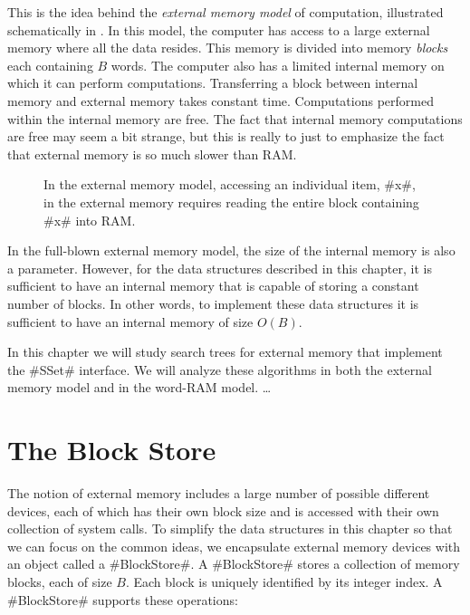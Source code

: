 
This is the idea behind the \emph{external memory model} of computation,
illustrated schematically in .  In this model, the computer
has access to a large external memory where all the data resides.
This memory is divided into memory \emph{blocks} each containing $B$
words.  The computer also has a limited internal memory on which it can
perform computations.  Transferring a block between internal memory and
external memory takes constant time.  Computations performed within the
internal memory are free.  The fact that internal memory computations
are free may seem a bit strange, but this is really to just to emphasize
the fact that external memory is so much slower than RAM.

\begin{figure}
  \caption{In the external memory model, accessing an individual item,
  #x#, in the external memory requires reading the entire block containing
  #x# into RAM.}
\end{figure}

In the full-blown external memory model, the size of the internal memory
is also a parameter.  However, for the data structures described in this
chapter, it is sufficient to have an internal memory that is capable
of storing a constant number of blocks.  In other words, to implement
these data structures it is sufficient to have an internal memory of
size $O(B)$.

In this chapter we will study search trees for external memory that
implement the #SSet# interface.  We will analyze these algorithms in
both the external memory model and in the word-RAM model. \ldots


\section{The Block Store}

The notion of external memory includes a large number of possible
different devices, each of which has their own block size and is
accessed with their own collection of system calls.  To simplify the
data structures in this chapter so that we can focus on the common ideas,
 we encapsulate external memory devices with an object called a
#BlockStore#.  A #BlockStore# stores a collection of memory blocks, each
of size $B$.  Each block is uniquely identified by its integer index.
A #BlockStore# supports these operations:


